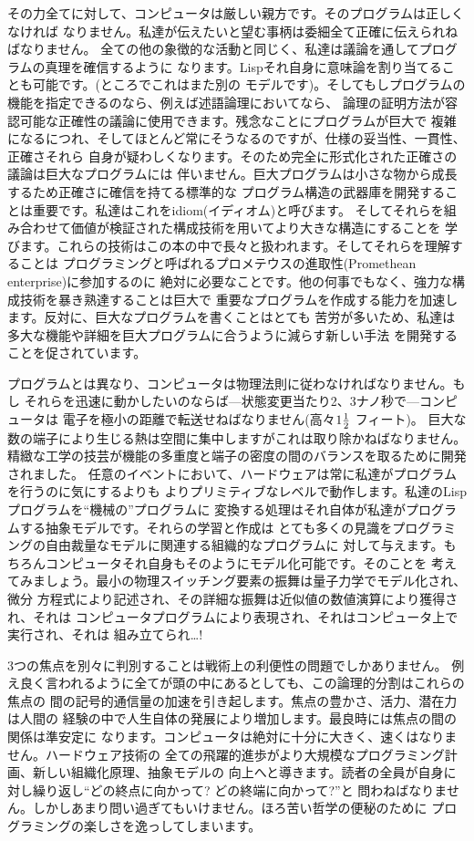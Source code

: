 \documentclass[oneside]{book}
\begin{document}
その力全てに対して、コンピュータは厳しい親方です。そのプログラムは正しくなければ
なりません。私達が伝えたいと望む事柄は委細全て正確に伝えられねばなりません。
全ての他の象徴的な活動と同じく、私達は議論を通してプログラムの真理を確信するように
なります。Lispそれ自身に意味論を割り当てることも可能です。(ところでこれはまた別の
モデルです)。そしてもしプログラムの機能を指定できるのなら、例えば述語論理においてなら、
論理の証明方法が容認可能な正確性の議論に使用できます。残念なことにプログラムが巨大で
複雑になるにつれ、そしてほとんど常にそうなるのですが、仕様の妥当性、一貫性、正確さそれら
自身が疑わしくなります。そのため完全に形式化された正確さの議論は巨大なプログラムには
伴いません。巨大プログラムは小さな物から成長するため正確さに確信を持てる標準的な
プログラム構造の武器庫を開発することは重要です。私達はこれをidiom(イディオム)と呼びます。
そしてそれらを組み合わせて価値が検証された構成技術を用いてより大きな構造にすることを
学びます。これらの技術はこの本の中で長々と扱われます。そしてそれらを理解することは
プログラミングと呼ばれるプロメテウスの進取性(Promethean enterprise)に参加するのに
絶対に必要なことです。他の何事でもなく、強力な構成技術を暴き熟達することは巨大で
重要なプログラムを作成する能力を加速します。反対に、巨大なプログラムを書くことはとても
苦労が多いため、私達は多大な機能や詳細を巨大プログラムに合うように減らす新しい手法
を開発することを促されています。



プログラムとは異なり、コンピュータは物理法則に従わなければなりません。もし
それらを迅速に動かしたいのならば---状態変更当たり2、3ナノ秒で---コンピュータは
電子を極小の距離で転送せねばなりません(高々\(1{1\over2}\) フィート)。
巨大な数の端子により生じる熱は空間に集中しますがこれは取り除かねばなりません。
精緻な工学の技芸が機能の多重度と端子の密度の間のバランスを取るために開発されました。
任意のイベントにおいて、ハードウェアは常に私達がプログラムを行うのに気にするよりも
よりプリミティブなレベルで動作します。私達のLispプログラムを``機械の''プログラムに
変換する処理はそれ自体が私達がプログラムする抽象モデルです。それらの学習と作成は
とても多くの見識をプログラミングの自由裁量なモデルに関連する組織的なプログラムに
対して与えます。もちろんコンピュータそれ自身もそのようにモデル化可能です。そのことを
考えてみましょう。最小の物理スイッチング要素の振舞は量子力学でモデル化され、微分
方程式により記述され、その詳細な振舞は近似値の数値演算により獲得され、それは
コンピュータプログラムにより表現され、それはコンピュータ上で実行され、それは
組み立てられ\dots !



3つの焦点を別々に判別することは戦術上の利便性の問題でしかありません。
例え良く言われるように全てが頭の中にあるとしても、この論理的分割はこれらの焦点の
間の記号的通信量の加速を引き起します。焦点の豊かさ、活力、潜在力は人間の
経験の中で人生自体の発展により増加します。最良時には焦点の間の関係は準安定に
なります。コンピュータは絶対に十分に大きく、速くはなりません。ハードウェア技術の
全ての飛躍的進歩がより大規模なプログラミング計画、新しい組織化原理、抽象モデルの
向上へと導きます。読者の全員が自身に対し繰り返し``どの終点に向かって? どの終端に向かって?''と
問わねばなりません。しかしあまり問い過ぎてもいけません。ほろ苦い哲学の便秘のために
プログラミングの楽しさを逸っしてしまいます。
\end{document}
